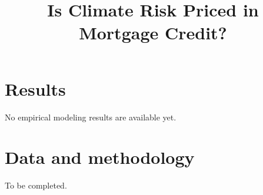 \documentclass{article}
\title{Is Climate Risk Priced in Mortgage Credit?}
\author{}
\date{}
\begin{document}
\maketitle
\section{Results}
No empirical modeling results are available yet.
\section{Data and methodology}
To be completed.
\end{document}
